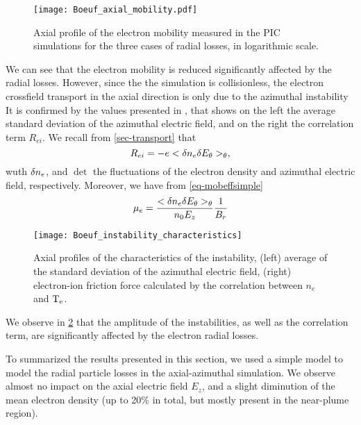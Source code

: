   \begin{figure}[hbtp]
    \centering
    \texttt{[image: Boeuf\_axial\_mobility.pdf]}
    \caption{Axial profile of the electron mobility measured in the \ac{PIC} simulations for the three cases of radial losses, in logarithmic scale.}
    \label{fig-mobility}
  \end{figure}

  We can see that the electron mobility is reduced significantly affected by the radial losses.
  However, since the the simulation is collisionless, the electron crossfield transport in the axial direction is only due to the azimuthal instability
  It is confirmed by the values presented in , that shows on the left the average standard deviation of the azimuthal electric field, and on the right the correlation term $R_{ei}$.
  We recall from \cref{sec-transport} that 
  \begin{equation} \label{eq-rei}
    R_{ei} =  - e < \delta n_e \delta E_{\theta} >_{\theta},
  \end{equation}
  wuth $\delta n_e$, and $\det$ the fluctuations of the electron density and azimuthal electric field, respectively.
  Moreover, we have from \cref{eq-mobeffsimple}
  \begin{equation*}
    \mu_e = \frac{< \delta n_e \delta E_{\theta} >_{\theta} }{n_0 E_z}   \frac{1}{B_r}
  \end{equation*}


  \begin{figure}[hbt]
    \centering
    \texttt{[image: Boeuf\_instability\_characteristics]}
    \caption{Axial profiles of the characteristics of the instability, (left) average of the standard deviation of the azimuthal electric field, (right) electron-ion friction force calculated by the correlation between $n_e$ and $\mathrm{T_e}$.    }
    \label{fig-boeuf-instability}
  \end{figure}

  
  We observe in \cref{fig-boeuf-instability} that the amplitude of the instabilities, as well as the correlation term, are significantly affected by the electron radial losses.
  
  To summarized the results presented in this section, we used a simple model to model the radial particle losses in the axial-azimuthal simulation.
  We observe almost no impact on the axial electric field $E_z$, and a slight diminution of the mean electron density (up to 20\% in total, but mostly present in the near-plume region).
  

